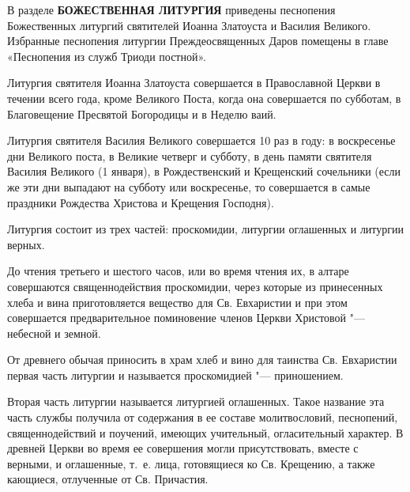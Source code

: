 

\label{_content_Liturgiya}



В разделе {\bfseries БОЖЕСТВЕННАЯ ЛИТУРГИЯ} приведены песнопения Божественных литургий святителей Иоанна Златоуста и Василия Великого. Избранные песнопения литургии Преждеосвященных Даров помещены в главе «Песнопения из служб Триоди постной».


Литургия святителя Иоанна Златоуста совершается в Православной Церкви в течении всего года, кроме Великого Поста, когда она совершается по субботам, в Благовещение Пресвятой Богородицы и в Неделю ваий.


Литургия святителя Василия Великого совершается 10 раз в году: в воскресенье дни Великого поста, в Великие четверг и субботу, в день памяти святителя Василия Великого (1 января), в Рождественский и Крещенский сочельники (если же эти дни выпадают на субботу или воскресенье, то совершается в самые праздники Рождества Христова и Крещения Господня).

Литургия состоит из трех частей: проскомидии, литургии оглашенных и литургии верных.
 

 


До чтения третьего и шестого часов, или во время чтения их, в алтаре совершаются священнодействия проскомидии, через которые из принесенных хлеба и вина приготовляется вещество для Св. Евхаристии и при этом совершается предварительное поминовение членов Церкви Христовой "--- небесной и земной.


От древнего обычая приносить в храм хлеб и вино для таинства Св. Евхаристии первая часть литургии и называется проскомидией "--- приношением.

\mychapterending


 


Вторая часть литургии называется литургией оглашенных. Такое название эта часть службы получила от содержания в ее составе молитвословий, песнопений, священнодействий и поучений, имеющих учительный, огласительный характер. В древней Церкви во время ее совершения могли присутствовать, вместе с верными, и оглашенные, т.~е. лица, готовящиеся ко Св. Крещению, а также кающиеся, отлученные от Св. Причастия.

